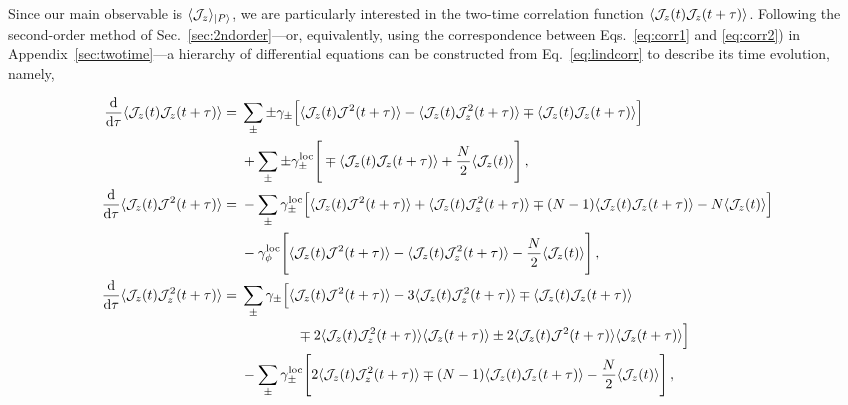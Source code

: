 \documentclass[aps,prd,10pt,twocolumn,superscriptaddress,floatfix,nofootinbib,amsmath,amssymb,altaffilletter,preprintnumbers]{revtex4-1}
\begin{document}
Since our main observable is $\langle {\cal J}_z \rangle_{|P\rangle}$, we are particularly interested in the two-time correlation function $\langle {\cal J}_z(t) {\cal J}_z(t+\tau) \rangle$.  Following the second-order method of Sec.~\ref{sec:2ndorder}---or, equivalently, using the correspondence between Eqs.~\eqref{eq:corr1} and \eqref{eq:corr2}) in Appendix~\ref{sec:twotime}---a hierarchy of differential equations can be constructed from Eq.~\eqref{eq:lindcorr} to describe its time evolution, namely,
\begin{widetext}
\begin{equation}
\begin{aligned}
\frac{{\rm d}}{{\rm d} \tau} \langle {\cal J}_z (t) {\cal J}_z(t+\tau) \rangle
 = \; & \sum_\pm \pm \gamma_\pm \Big[\langle {\cal J}_z(t) {\cal J}^2(t+\tau)  \rangle - \langle  {\cal J}_z(t){\cal J}_z^2(t+\tau) \rangle  \mp \langle {\cal J}_z(t) {\cal J}_z(t+\tau) \rangle
\Big] \\
\; &  + \sum_\pm \pm \gamma_\pm^{\rm loc} \Bigg[\mp\langle {\cal J}_z (t) {\cal J}_z(t+\tau) \rangle + \frac{N}{2}\langle {\cal J}_z(t)\rangle \Bigg] \, , \\
\frac{\rm d}{{\rm d}\tau} \langle {\cal J}_z(t)   {\cal J}^2(t+\tau) \rangle =
\; &- \sum_{\pm}\gamma_\pm^{\rm loc} \Big[\langle  {\cal J}_z(t) {\cal J}^2(t+\tau)\rangle +\langle {\cal J}_z(t) {\cal J}_z^2 (t+\tau)\rangle \mp (N-1) \langle {\cal J}_z (t) {\cal J}_z(t+\tau) \rangle  - N \langle {\cal J}_z(t) \rangle\Big]  \\
\; & - \gamma_{\phi}^{\rm loc} \Bigg[ \langle {\cal J}_z(t)  {\cal J}^2(t+\tau)  \rangle - \langle {\cal J}_z(t) {\cal J}_z^2(t+\tau)   \rangle  - \frac{N}{2} \langle{\cal J}_z(t)\rangle \Bigg]\, ,\\
\frac{\rm d}{{\rm d}\tau} \langle  {\cal J}_z(t)  {\cal J}_z^2(t+\tau) \rangle  
=\; & \sum_{\pm}\gamma_{\pm} \Big[ \langle  {\cal J}_z(t)  {\cal J}^2(t+\tau)  \rangle  - 3 \langle  {\cal J}_z(t) {\cal J}_z^2(t+\tau) \rangle \mp \langle {\cal J}_z(t) {\cal J}_z(t+\tau) \rangle     \\
\; & \qquad \qquad \mp  2 \langle  {\cal J}_z(t)  {\cal J}_z^2(t+\tau) \rangle \langle {\cal J}_z(t+\tau)  \rangle \pm 2 \langle {\cal J}_z(t)  {\cal J}^2(t+\tau)   \rangle \langle  {\cal J}_z(t+\tau) \rangle  \Big]\\
\; &  - \sum_\pm\gamma_\pm^{\rm loc} \Bigg[2 \langle  {\cal J}_z(t) {\cal J}_z^2(t+\tau) \rangle \mp(N-1) \langle {\cal J}_z(t) {\cal J}_z(t+\tau) \rangle -\frac{N}{2} \langle  {\cal J}_z(t)\rangle\Bigg] \, ,
    \label{eq:secondorderapproxCorr}
\end{aligned}
\end{equation}
\end{widetext}
\end{document}
